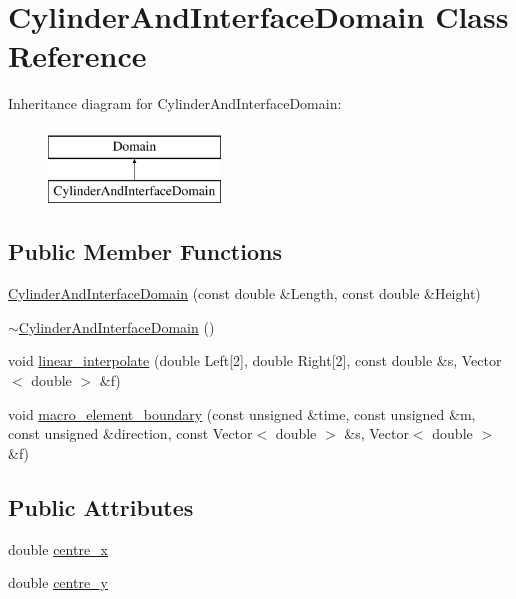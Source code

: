 \hypertarget{classCylinderAndInterfaceDomain}{}\section{Cylinder\+And\+Interface\+Domain Class Reference}
\label{classCylinderAndInterfaceDomain}
Inheritance diagram for Cylinder\+And\+Interface\+Domain\+:\begin{figure}[H]
\begin{center}
\leavevmode
\includegraphics[height=2.000000cm]{classCylinderAndInterfaceDomain}
\end{center}
\end{figure}
\subsection*{Public Member Functions}
\begin{DoxyCompactItemize}
\item 
\hyperlink{classCylinderAndInterfaceDomain_a2025ff5337b4cb7889c26109857ed521}{Cylinder\+And\+Interface\+Domain} (const double \&Length, const double \&Height)
\item 
\hyperlink{classCylinderAndInterfaceDomain_aa204e83ef6332f121123465f4167d341}{$\sim$\+Cylinder\+And\+Interface\+Domain} ()
\item 
void \hyperlink{classCylinderAndInterfaceDomain_acab40651417c703e6b3dc592198c7497}{linear\+\_\+interpolate} (double Left\mbox{[}2\mbox{]}, double Right\mbox{[}2\mbox{]}, const double \&s, Vector$<$ double $>$ \&f)
\item 
void \hyperlink{classCylinderAndInterfaceDomain_a6afdef0d863b2833884aed2f571eeb79}{macro\+\_\+element\+\_\+boundary} (const unsigned \&time, const unsigned \&m, const unsigned \&direction, const Vector$<$ double $>$ \&s, Vector$<$ double $>$ \&f)
\end{DoxyCompactItemize}
\subsection*{Public Attributes}
\begin{DoxyCompactItemize}
\item 
double \hyperlink{classCylinderAndInterfaceDomain_a0b5aefe768267a1dff936ab491bee938}{centre\+\_\+x}
\item 
double \hyperlink{classCylinderAndInterfaceDomain_ac461297e0b08287a1909f245569c77f0}{centre\+\_\+y}
\end{DoxyCompactItemize}
